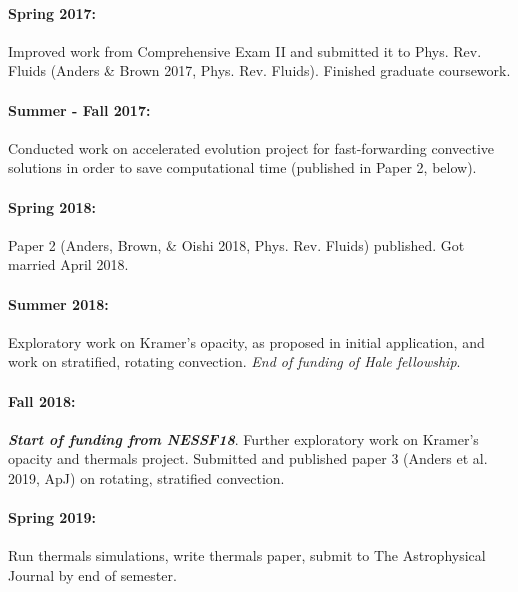 \documentclass[aasms,12pt]{article}
\begin{document}
\vspace{-0.4cm}
\paragraph{Spring 2017:} Improved work from Comprehensive Exam II and submitted it to Phys.
Rev. Fluids (Anders \& Brown 2017, Phys. Rev. Fluids).  Finished graduate coursework.

\vspace{-0.4cm}
\paragraph{Summer - Fall 2017:}  Conducted work on accelerated evolution project for
fast-forwarding convective solutions in order to save computational time (published in
Paper 2, below).

\vspace{-0.4cm}
\paragraph{Spring 2018:} Paper 2 (Anders, Brown, \& Oishi 2018, Phys. Rev. Fluids) published.
Got married April 2018.

\vspace{-0.4cm}
\paragraph{Summer 2018:}  Exploratory work on Kramer's opacity, as proposed in initial
application, and work on stratified, rotating convection. \emph{End of funding of Hale fellowship}.

\vspace{-0.4cm}
\paragraph{Fall 2018:} \textbf{\emph{Start of funding from NESSF18}}. Further exploratory work
on Kramer's opacity and thermals project. Submitted and
published paper 3 (Anders et al. 2019, ApJ) on rotating, stratified convection.

\vspace{-0.4cm}
\paragraph{Spring 2019:} Run thermals simulations, write thermals paper, submit
to The Astrophysical Journal by end of semester.

\vspace{-0.4cm}
\end{document}
